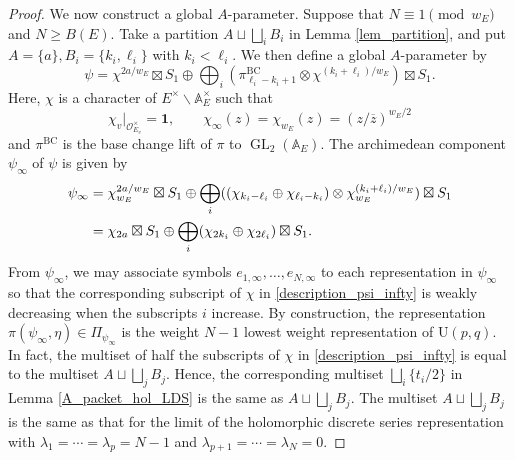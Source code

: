 \documentclass[11pt]{amsart}
\theoremstyle{plain}
\theoremstyle{definition}
\numberwithin{equation}{section}
\def\GL{\mathop{\mathrm{GL}}\nolimits}
\def\OO{\mathscr{O}}
\def\U{\mathrm{U}}
\newcommand{\bbA}{\mathbb{A}}
\newcommand{\BC}{\mathrm{BC}}
\begin{document}
\begin{proof}
We now construct a global $A$-parameter.
Suppose that $N\equiv 1 \pmod{w_E}$ and $N \geq B(E)$.
Take a partition $A \sqcup \bigsqcup_i B_i$ in Lemma \ref{lem_partition}, and put $A = \{a\}, B_i = \{k_i, \ell_i\}$ with $k_i<\ell_i$.
We then define a global $A$-parameter by
\[
\psi = 
\chi^{2a/w_E} \boxtimes S_1  \oplus \bigoplus_i (\pi^{\BC}_{\ell_i-k_i+1} \otimes \chi^{(k_i+\ell_i)/w_E}) \boxtimes S_1.
\]
Here, $\chi$ is a character of $E^\times \backslash\bbA_E^\times$ such that
\[
\chi_v|_{\OO_{E_v}^\times} = \mathbf{1}, \qquad \chi_\infty(z) = \chi_{w_E}(z) = (z/\overline{z})^{w_E/2}
\]
and $\pi^\BC$ is the base change lift of $\pi$ to $\GL_2(\bbA_E)$.
The archimedean component $\psi_\infty$ of $\psi$ is given by
\begin{align}
\psi_\infty &= 
\chi^{2a/w_E}_{w_E} \boxtimes S_1 \oplus \bigoplus_i ((\chi_{k_i-\ell_i} \oplus \chi_{\ell_i-k_i})\otimes \chi_{w_E}^{(k_i+\ell_i)/w_E})\boxtimes S_1 \notag\\
&= 
\chi_{2a} \boxtimes S_1 \oplus \bigoplus_i (\chi_{2k_i} \oplus \chi_{2\ell_i})\boxtimes S_1.
\label{description_psi_infty}
\end{align}
From $\psi_\infty$, we may associate symbols $e_{1,\infty}, \ldots, e_{N, \infty}$ to each representation in $\psi_\infty$ so that the corresponding subscript of $\chi$ in \eqref{description_psi_infty} is weakly decreasing when the subscripts $i$ increase.
By construction, the representation $\pi(\psi_\infty,\eta) \in \Pi_{\psi_\infty}$ is the weight $N-1$ lowest weight representation of $\U(p,q)$.
In fact, the multiset of half the subscripts of $\chi$ in \eqref{description_psi_infty} is equal to the multiset $A \sqcup \bigsqcup_j B_j$.
Hence, the corresponding multiset $\bigsqcup_i \{t_i/2\}$ in Lemma \ref{A_packet_hol_LDS} is the same as $A \sqcup \bigsqcup_j B_j$.
The multiset $A \sqcup \bigsqcup_j B_j$ is the same as that for the limit of the holomorphic discrete series representation with $\lambda_1 = \cdots = \lambda_p = N-1$ and $\lambda_{p+1} = \cdots = \lambda_N = 0$.


\end{proof}
\end{document}
